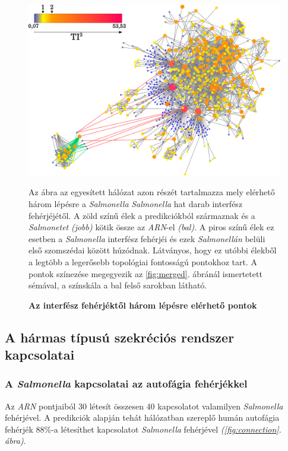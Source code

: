 \documentclass[a4paper,12pt]{article}
\newenvironment{imgdesc}{
		\small
		\singlespacing
		\begin{center}
		
	}{
		\end{center}	
	}
\begin{document}
			\begin{figure}[H]
				\includegraphics[scale=0.50]{img/merged-3-step-from-connecting-salmonella.pdf}
				\centering
				\caption{ \textbf{Az interfész fehérjéktől három lépésre elérhető pontok}}
				\begin{imgdesc}
					Az ábra az egyesített hálózat azon részét tartalmazza mely elérhető három lépésre a \textit{Salmonella} \textit{Salmonella} hat darab interfész fehérjéjétől. A zöld színű élek a predikciókból származnak és a \textit{Salmonetet} \textit{(jobb)} kötik össze az \textit{ARN}-el \textit{(bal)}. A piros színű élek ez esetben a \textit{Salmonella} interfész fehérjéi és ezek \textit{Salmonellán} belüli első szomszédai között húzódnak. Látványos, hogy ez utóbbi élekből a legtöbb a legerősebb topológiai fontosságú pontokhoz tart. A pontok színezése megegyezik az \ref{fig:merged}. ábránál ismertetett sémával, a színskála a bal felső sarokban látható.
				\end{imgdesc}			
				\label{fig:merged-3-step}			 		 
			\end{figure}			
		
	\subsection{A hármas típusú szekréciós rendszer kapcsolatai}	
		
		\subsubsection{A \textit{Salmonella} kapcsolatai az autofágia fehérjékkel}
		
		Az \textit{ARN} pontjaiból 30 létesít összesen 40 kapcsolatot valamilyen \textit{Salmonella} fehérjével. A predikciók alapján tehát hálózatban szereplő humán autofágia fehérjék 88\%-a létesíthet kapcsolatot \textit{Salmonella} fehérjével \textit{(\ref{fig:connection}. ábra)}.
		
\end{document}
